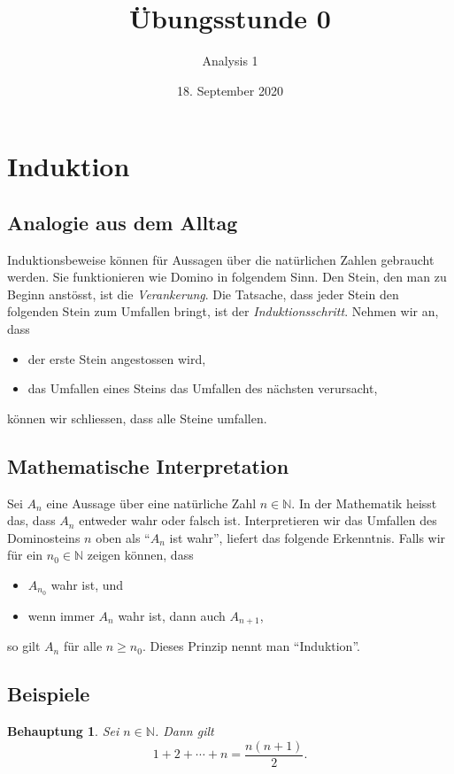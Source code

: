 \documentclass[12pt,a4paper]{article}
\title{Übungsstunde 0}
\author{Analysis 1}
\date{18. September 2020}
\newtheorem*{claim}{Behauptung}
\theoremstyle{definition}
\begin{document}
\maketitle
\section{Induktion}
\subsection*{Analogie aus dem Alltag}
Induktionsbeweise können für Aussagen
über die natürlichen Zahlen
gebraucht werden.
Sie funktionieren wie Domino
in folgendem Sinn.
Den Stein, den man zu Beginn anstösst,
ist die \textit{Verankerung}.
Die Tatsache, dass jeder Stein
den folgenden Stein zum Umfallen bringt,
ist der \textit{Induktionsschritt}.
Nehmen wir an, dass
\begin{itemize}
  \item der erste Stein angestossen wird,
  \item das Umfallen eines Steins das Umfallen des nächsten verursacht,
\end{itemize}
können wir schliessen, dass alle Steine umfallen.

\subsection*{Mathematische Interpretation}
Sei $A_{n}$ eine Aussage über eine natürliche Zahl $n \in \mathbb N$.
In der Mathematik heisst das, dass $A_n$
entweder wahr oder falsch ist.
Interpretieren wir das Umfallen des Dominosteins $n$ oben
als ``$A_{n}$ ist wahr'', liefert das folgende Erkenntnis.
Falls wir für ein $n_{0} \in \mathbb N$ zeigen können,
dass
\begin{itemize}
  \item
    $A_{n_{0}}$ wahr ist, und
  \item
    wenn immer $A_{n}$ wahr ist, dann auch $A_{n+1}$,
\end{itemize}
so gilt $A_{n}$ für alle $n \geq n_{0}$.
Dieses Prinzip nennt man ``Induktion''.

\subsection*{Beispiele}
\begin{claim}
  Sei $n \in \mathbb N$. Dann gilt
  \[1 + 2 + \cdots + n = \frac{n(n+1)}{2}.\]
\end{claim}
\end{document}
